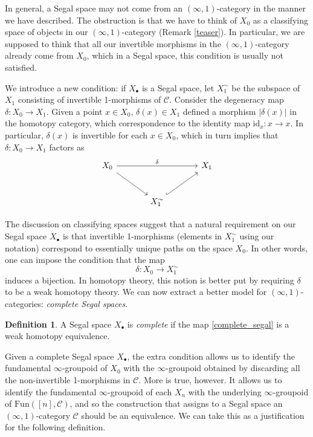 \documentclass[a4paper,11pt]{article}
\newcommand{\ccal}{\mathcal{C}}
\newcommand{\ide}{\mathrm{id}}
\theoremstyle{plain}
\theoremstyle{definition}
\newtheorem{defi}[thm]{Definition}
\theoremstyle{remark}
\begin{document}
In general, a Segal space may not come from an $(\infty, 1)$-category in the manner we have described. The obstruction is that we have to think of $X_0$ as a classifying space of objects in our $(\infty, 1)$-category (Remark \ref{teaser}). In particular, we are supposed to think that all our invertible morphisms in the $(\infty, 1)$-category already come from $X_0$, which in a Segal space, this condition is usually not satisfied. 

We introduce a new condition: if $X_{\bullet}$ is a Segal space, let $X_1^{\sim}$ be the subspace of $X_1$ consisting of invertible 1-morphisms of $\ccal$. Consider the degeneracy map $\delta \colon X_0 \to X_1$. Given a point $x \in X_0$, $\delta(x) \in X_1$ defined a morphism $|\delta(x)|$ in the homotopy category, which correspondence to the identity map $\ide_x \colon x \to x$. In particular, $\delta(x)$ is invertible for each $x \in X_0$, which in turn implies that $\delta \colon X_0 \to X_1$ factors as 
\begin{equation*}
\begin{tikzcd}[row sep = large, column sep = large]
X_0 \arrow[rd] \arrow[rr, "\delta"] & & X_1 \\
& X_1^{\sim} \arrow[ru, hook] &
\end{tikzcd}
\end{equation*}

The discussion on classifying spaces suggest that a natural requirement on our Segal space $X_{\bullet}$ is that invertible 1-morphisms (elements in $X_1^{\sim}$ using our notation) correspond to essentially unique paths on the space $X_0$. In other words, one can impose the condition that the map 
\begin{equation}
\label{complete_segal}
\delta \colon X_0 \to X_1^{\sim}
\end{equation}
induces a bijection. In homotopy theory, this notion is better put by requiring $\delta$ to be a weak homotopy theory. We can now extract a better model for $(\infty, 1)$-categories: \textit{complete Segal spaces}.

\begin{defi}
A Segal space $X_{\bullet}$ is \textit{complete} if the map \eqref{complete_segal} is a weak homotopy equivalence. 
\end{defi}

Given a complete Segal space $X_{\bullet}$, the extra condition allows us to identify the fundamental $\infty$-groupoid of $X_0$ with the $\infty$-groupoid obtained by discarding all the non-invertible 1-morphisms in $\ccal$. More is true, however. It allows us to identify the fundamental $\infty$-groupoid of each $X_n$ with the underlying $\infty$-groupoid of $\text{Fun}([n], \ccal)$, and so the construction that assigns to a Segal space an $(\infty, 1)$-category $\ccal$ should be an equivalence. We can take this as a justification for the following definition. 
\end{document}
